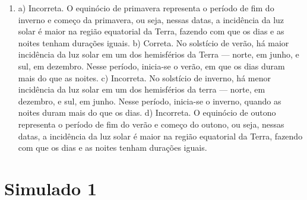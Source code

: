 \begin{enumerate}
\item
a) Incorreta. O equinócio de primavera representa o período de fim do
inverno e começo da primavera, ou seja, nessas datas, a incidência da
luz solar é maior na região equatorial da Terra, fazendo com que os dias
e as noites tenham durações iguais.
b) Correta. No solstício de verão, há maior incidência da luz solar em
um dos hemisférios da Terra --- norte, em junho, e sul, em dezembro.
Nesse período, inicia-se o verão, em que os dias duram mais do que as
noites.
c) Incorreta. No solstício de inverno, há menor incidência da luz solar
em um dos hemisférios da terra --- norte, em dezembro, e sul, em junho.
Nesse período, inicia-se o inverno, quando as noites duram mais do que
os dias.
d) Incorreta. O equinócio de outono representa o período de fim do verão
e começo do outono, ou seja, nessas datas, a incidência da luz solar é
maior na região equatorial da Terra, fazendo com que os dias e as noites
tenham durações iguais.
\end{enumerate}

\section*{Simulado 1}

